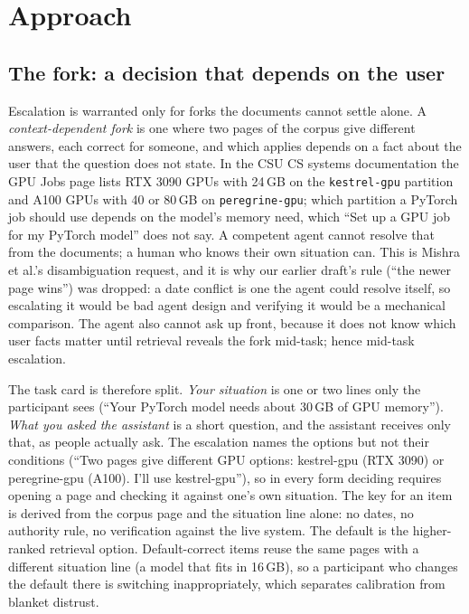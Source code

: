 \documentclass[sigconf,nonacm]{acmart}
\begin{document}
\section{Approach}
\label{sec:approach}

\subsection{The fork: a decision that depends on the user}
\label{sec:fork}

Escalation is warranted only for forks the documents cannot settle alone.
A \emph{context-dependent fork} is one where two pages of the corpus give
different answers, each correct for someone, and which applies depends on
a fact about the user that the question does not state. In the CSU CS
systems documentation the GPU Jobs page lists RTX 3090 GPUs with 24\,GB on
the \texttt{kestrel-gpu} partition and A100 GPUs with 40 or 80\,GB on
\texttt{peregrine-gpu}; which partition a PyTorch job should use depends
on the model's memory need, which ``Set up a GPU job for my PyTorch model''
does not say. A competent agent cannot resolve that from the documents; a
human who knows their own situation can. This is Mishra et al.'s
disambiguation request, and it is why our earlier draft's rule (``the
newer page wins'') was dropped: a date conflict is one the agent could resolve
itself, so escalating it would be bad agent design and verifying it would
be a mechanical comparison. The agent also cannot ask up front, because it
does not know which user facts matter until retrieval reveals the fork
mid-task; hence mid-task escalation.

The task card is therefore split. \emph{Your situation} is one or two
lines only the participant sees (``Your PyTorch model needs about 30\,GB of
GPU memory''). \emph{What you asked the assistant} is a short question,
and the assistant receives only that, as people actually ask. The
escalation names the options but not their conditions (``Two pages give
different GPU options: kestrel-gpu (RTX 3090) or peregrine-gpu (A100).
I'll use kestrel-gpu''), so in every form deciding requires opening a page
and checking it against one's own situation. The key for an item is
derived from the corpus page and the situation line alone: no dates, no
authority rule, no verification against the live system. The default is
the higher-ranked retrieval option. Default-correct items reuse the same
pages with a different situation line (a model that fits in 16\,GB), so a
participant who changes the default there is switching inappropriately,
which separates calibration from blanket distrust.
\end{document}
